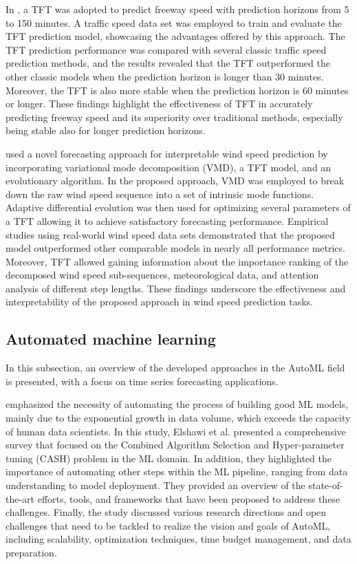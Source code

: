 In \cite{ZHANG2022329}, a TFT was adopted to predict freeway speed with prediction horizons from 5 to 150 minutes.
A traffic speed data set was employed to train and evaluate the TFT prediction model, showcasing the advantages offered by this approach.
The TFT prediction performance was compared with several classic traffic speed prediction methods, and the results revealed that the TFT outperformed the other classic models when the prediction horizon is longer than 30 minutes.
Moreover, the TFT is also more stable when the prediction horizon is 60 minutes or longer.
These findings highlight the effectiveness of TFT in accurately predicting freeway speed and its superiority over traditional methods, especially being stable also for longer prediction horizons.

\cite{WU2022123990} used a novel forecasting approach for interpretable wind speed prediction by incorporating variational mode decomposition (VMD), a TFT model, and an evolutionary algorithm.
In the proposed approach, VMD was employed to break down the raw wind speed sequence into a set of intrinsic mode functions.
Adaptive differential evolution was then used for optimizing several parameters of a TFT allowing it to achieve satisfactory forecasting performance.
Empirical studies using real-world wind speed data sets demonstrated that the proposed model outperformed other comparable models in nearly all performance metrics.
Moreover, TFT allowed gaining information about the importance ranking of the decomposed wind speed sub-sequences, meteorological data, and attention analysis of different step lengths.
These findings underscore the effectiveness and interpretability of the proposed approach in wind speed prediction tasks.


\vspace{0.1 cm}
\subsection{Automated machine learning}
\label{sec:automl}
\vspace{0.1 cm}

In this subsection, an overview of the developed approaches in the AutoML field is presented, with a focus on time series forecasting applications.

\cite{Elshawi2019} emphasized the necessity of automating the process of building good ML models, mainly due to the exponential growth in data volume, which exceeds the capacity of human data scientists.
In this study, Elshawi et al. presented a comprehensive survey that focused on the Combined Algorithm Selection and Hyper-parameter tuning (CASH) problem in the ML domain.
In addition, they highlighted the importance of automating other steps within the ML pipeline, ranging from data understanding to model deployment.
They provided an overview of the state-of-the-art efforts, tools, and frameworks that have been proposed to address these challenges.
Finally, the study discussed various research directions and open challenges that need to be tackled to realize the vision and goals of AutoML, including scalability, optimization techniques, time budget management, and data preparation.

